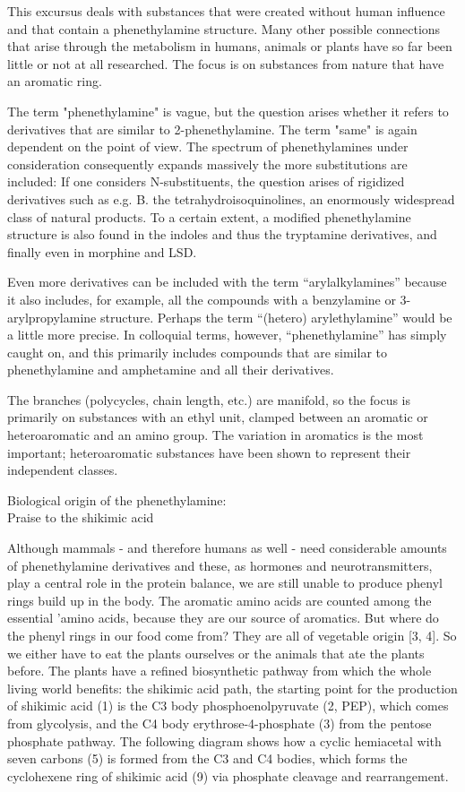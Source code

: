 \bigbreak
This excursus deals with substances that were created without human influence and that contain a phenethylamine structure. Many other possible connections that arise through the metabolism in humans, animals or plants have so far been little or not at all researched. The focus is on substances from nature that have an aromatic ring.
\clearpage

The term "phenethylamine" is vague, but the question arises whether it refers to derivatives that are similar to 2-phenethylamine. The term "same" is again dependent on the point of view. The spectrum of phenethylamines under consideration consequently expands massively the more substitutions are included: If one considers N-substituents, the question arises of rigidized derivatives such as e.g. B. the tetrahydroisoquinolines, an enormously widespread class of natural products. To a certain extent, a modified phenethylamine structure is also found in the indoles and thus the tryptamine derivatives, and finally even in morphine and LSD.
\bigbreak

Even more derivatives can be included with the term “arylalkylamines” because it also includes, for example, all the compounds with a benzylamine or 3-arylpropylamine structure. Perhaps the term “(hetero) arylethylamine” would be a little more precise. In colloquial terms, however, “phenethylamine” has simply caught on, and this primarily includes compounds that are similar to phenethylamine and amphetamine and all their derivatives.
\bigbreak

The branches (polycycles, chain length, etc.) are manifold, so the focus is primarily on substances with an ethyl unit, clamped between an aromatic or heteroaromatic and an amino group. The variation in aromatics is the most important; heteroaromatic substances have been shown to represent their independent classes.
\bigbreak

\begin{center}
Biological origin of the phenethylamine:\\
Praise to the shikimic acid
\bigbreak
\end{center}

Although mammals - and therefore humans as well - need considerable amounts of phenethylamine derivatives and these, as hormones and neurotransmitters, play a central role in the protein balance, we are still unable to produce phenyl rings build up in the body. The aromatic amino acids are counted among the essential 'amino acids, because they are our source of aromatics. But where do the phenyl rings in our food come from? They are all of vegetable origin [3, 4]. So we either have to eat the plants ourselves or the animals that ate the plants before. The plants have a refined biosynthetic pathway from which the whole living world benefits: the shikimic acid path, the starting point for the production of shikimic acid (1) is the C3 body phosphoenolpyruvate (2, PEP), which comes from glycolysis, and the C4 body erythrose-4-phosphate (3) from the pentose phosphate pathway. The following diagram shows how a cyclic hemiacetal with seven carbons (5) is formed from the C3 and C4 bodies, which forms the cyclohexene ring of shikimic acid (9) via phosphate cleavage and rearrangement.
\clearpage

